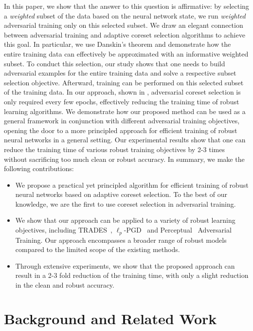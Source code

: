 \documentclass[runningheads]{llncs}
\begin{document}
In this paper, we show that the answer to this question is affirmative:
by selecting a \textit{weighted} subset of the data based on the neural network state, we run \textit{weighted} adversarial training only on this selected subset.
We draw an elegant connection between adversarial training and adaptive coreset selection algorithms to achieve this goal.
In particular, we use Danskin's theorem and demonstrate how the entire training data can effectively be approximated with an informative weighted subset.
To conduct this selection, our study shows that one needs to build adversarial examples for the entire training data and solve a respective subset selection objective.
Afterward, training can be performed on this selected subset of the training data.
In our approach, shown in , adversarial coreset selection is only required every few epochs, effectively reducing the training time of robust learning algorithms.
We demonstrate how our proposed method can be used as a general framework in conjunction with different adversarial training objectives, opening the door to a more principled approach for efficient training of robust neural networks in a general setting.
Our experimental results show that one can reduce the training time of various robust training objectives by 2-3 times without sacrificing too much clean or robust accuracy.
In summary, we make the following contributions:
\begin{itemize}\setlength\itemsep{0.25em}
	\item We propose a practical yet principled algorithm for efficient training of robust neural networks based on adaptive coreset selection. To the best of our knowledge, we are the first to use coreset selection in adversarial training.
	\item We show that our approach can be applied to a variety of robust learning objectives, including TRADES~\cite{zhang2019trades}, $\ell_p$-PGD~\cite{madry2018towards} and Perceptual~\cite{laidlaw2021pat} Adversarial Training. Our approach encompasses a broader range of robust models compared to the limited scope of the existing methods. 
	\item Through extensive experiments, we show that the proposed approach can result in a 2-3 fold reduction of the training time, with only a slight reduction in the clean and robust accuracy.
\end{itemize}
\section{Background and Related Work}\label{sec:background}
\end{document}
